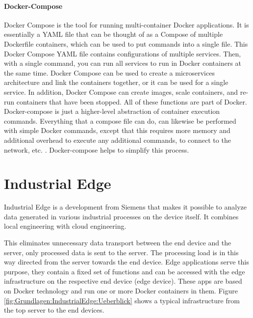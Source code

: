 		\paragraph{Docker-Compose}
		Docker Compose is the tool for running multi-container Docker applications. It is essentially a YAML file that can be thought of as a Compose of multiple Dockerfile containers, which can be used to put commands into a single file. This Docker Compose YAML file contains configurations of multiple services. Then, with a single command, you can run all services to run in Docker containers at the same time.
		Docker Compose can be used to create a microservices architecture and link the containers together, or it can be used for a single service. In addition, Docker Compose can create images, scale containers, and re-run containers that have been stopped. All of these functions are part of Docker. Docker-compose is just a higher-level abstraction of container execution commands. Everything that a compose file can do, can likewise be performed with simple Docker commands, except that this requires more memory and additional overhead to execute any additional commands, to connect to the network, etc. . Docker-compose helps to simplify this process.
				
	\section{Industrial Edge}
	\label{Grundlagen:IndustrialEdge}
		
	Industrial Edge is a development from Siemens that makes it possible to analyze data generated in various industrial processes on the device itself. It combines local engineering with cloud engineering.\cite{siemensIndustrialEdge}

	This eliminates unnecessary data transport between the end device and the server, only processed data is sent to the server. The processing load is in this way directed from the server towards the end device. Edge applications serve this purpose, they contain a fixed set of functions and can be accessed with the edge infrastructure on the respective end device (edge device). These apps are based on Docker technology and run one or more Docker containers in them. Figure \ref{fig:Grundlagen:IndustrialEdge:Ueberblick} shows a typical infrastructure from the top server to the end devices.

